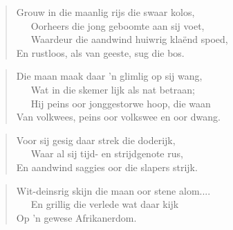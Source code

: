\begin{verse}
Grouw in die maanlig rijs die swaar kolos, \\ 
\ \ \ Oorheers die jong geboomte aan sij voet, \\
\ \ \ Waardeur die aandwind huiwrig klaënd spoed, \\
En rustloos, als van geeste, sug die bos.
\end{verse}

\begin{verse}
Die maan maak daar ’n glimlig op sij wang, \\
\ \ \ Wat in die skemer lijk als nat betraan; \\
\ \ \ Hij peins oor jonggestorwe hoop, die waan \\
Van volkwees, peins oor volkswee en oor dwang.
\end{verse}

\begin{verse}
Voor sij gesig daar strek die doderijk, \\
\ \ \ Waar al sij tijd- en strijdgenote rus, \\
En aandwind saggies oor die slapers strijk.
\end{verse}

\begin{verse}
Wit-deinsrig skijn die maan oor stene alom.... \\
\ \ \ En grillig die verlede wat daar kijk \\
Op ’n gewese Afrikanerdom.
\end{verse}

